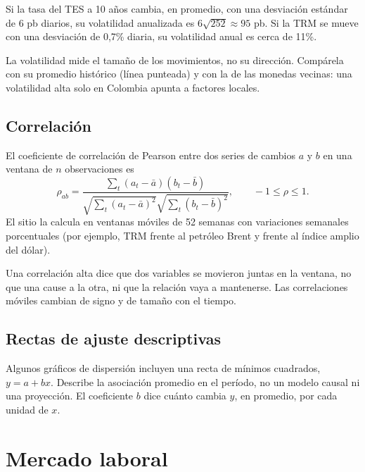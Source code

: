 \begin{dato}
Si la tasa del TES a 10 años cambia, en promedio, con una desviación estándar de 6 pb diarios, su volatilidad
anualizada es $6\sqrt{252}\approx95$ pb. Si la TRM se mueve con una desviación de 0,7\% diaria, su volatilidad anual
es cerca de 11\%.
\end{dato}

\begin{leer}
La volatilidad mide el tamaño de los movimientos, no su dirección. Compárela con su promedio histórico (línea
punteada) y con la de las monedas vecinas: una volatilidad alta solo en Colombia apunta a factores locales.
\end{leer}

\section{Correlación}
\label{es:f:correlacion}
El coeficiente de correlación de Pearson entre dos series de cambios $a$ y $b$ en una ventana de $n$ observaciones es
\[
\rho_{ab}=\frac{\sum_t(a_t-\bar a)(b_t-\bar b)}{\sqrt{\sum_t(a_t-\bar a)^2}\sqrt{\sum_t(b_t-\bar b)^2}},\qquad -1\le\rho\le1 .
\]
El sitio la calcula en ventanas móviles de 52 semanas con variaciones semanales porcentuales (por ejemplo, TRM
frente al petróleo Brent y frente al índice amplio del dólar).

\begin{alerta}
Una correlación alta dice que dos variables se movieron juntas en la ventana, no que una cause a la otra, ni que la
relación vaya a mantenerse. Las correlaciones móviles cambian de signo y de tamaño con el tiempo.
\end{alerta}

\section{Rectas de ajuste descriptivas}
Algunos gráficos de dispersión incluyen una recta de mínimos cuadrados, $y=a+bx$. Describe la asociación promedio en
el período, no un modelo causal ni una proyección. El coeficiente $b$ dice cuánto cambia $y$, en promedio, por cada
unidad de $x$.

\chapter{Mercado laboral}
\label{es:f:laboral}

